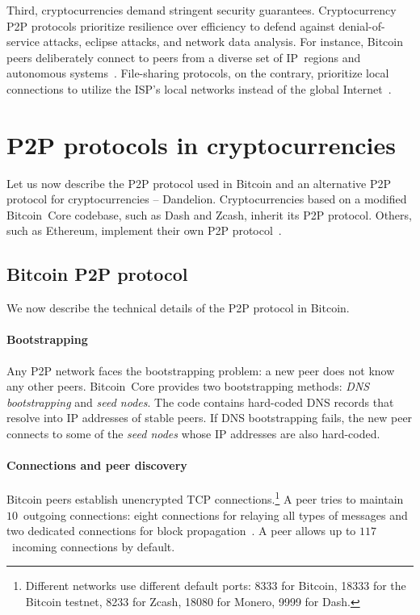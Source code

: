 Third, cryptocurrencies demand stringent security guarantees.
Cryptocurrency P2P protocols prioritize resilience over efficiency to defend against denial-of-service attacks, eclipse attacks, and network data analysis.
For instance, Bitcoin peers deliberately connect to peers from a diverse set of IP~regions and autonomous systems~\cite{Naumenko2019a}.
File-sharing protocols, on the contrary, prioritize local connections to utilize the ISP's local networks instead of the global Internet~\cite{Yoshida2012,Wang2012}.


\section{P2P protocols in cryptocurrencies}

Let us now describe the P2P protocol used in Bitcoin and an alternative P2P protocol for cryptocurrencies -- Dandelion.
Cryptocurrencies based on a modified Bitcoin~Core codebase, such as Dash and Zcash, inherit its P2P protocol.
Others, such as Ethereum, implement their own P2P protocol~\cite{Henningsen2019}.

\subsection{Bitcoin P2P protocol}
\label{sec:BitcoinP2PProtocol}

We now describe the technical details of the P2P protocol in Bitcoin.

\paragraph{Bootstrapping}

Any P2P network faces the bootstrapping problem: a new peer does not know any other peers.
Bitcoin~Core provides two bootstrapping methods: \textit{DNS bootstrapping} and \textit{seed nodes}.
The code contains hard-coded DNS records that resolve into IP addresses of stable peers.
If DNS bootstrapping fails, the new peer connects to some of the \textit{seed nodes} whose IP addresses are also hard-coded.


\paragraph{Connections and peer discovery}

Bitcoin peers establish unencrypted TCP connections.\footnote{Different networks use different default ports: 8333 for Bitcoin, 18333 for the Bitcoin testnet, 8233 for Zcash, 18080 for Monero, 9999 for Dash.}
A peer tries to maintain $10$~outgoing connections: eight connections for relaying all types of messages and two dedicated connections for block propagation~\cite{Daftuar2019}.
A peer allows up to $117$~incoming connections by default.

